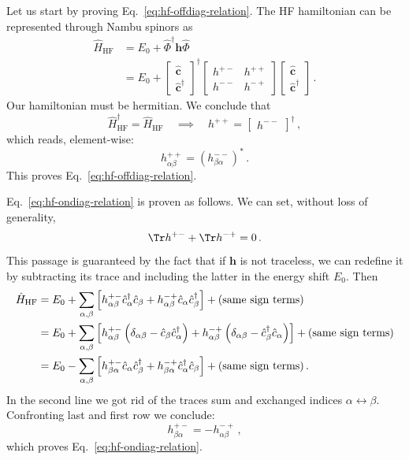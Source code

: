 \begin{tabproof}
	
	Let us start by proving Eq.~\eqref{eq:hf-offdiag-relation}. The HF hamiltonian can be represented through Nambu spinors as
	\[
	\begin{aligned}
		\hat H_\mathrm{HF} &= E_0 + \hat \Phi^\dagger \mathbf{h} \hat \Phi \\
		&= E_0 + \begin{bmatrix}
			\hat{\mathbf{c}} \\ \hat{\mathbf{c}}^\dagger
		\end{bmatrix}^\dagger \begin{bmatrix}
			h^{+-} & h^{++} \\
			h^{--} & h^{-+}
		\end{bmatrix} \begin{bmatrix}
		\hat{\mathbf{c}} \\ \hat{\mathbf{c}}^\dagger
		\end{bmatrix} \, .
	\end{aligned}
	\]
	Our hamiltonian must be hermitian. We conclude that
	\[
		\hat H_\mathrm{HF}^\dagger = \hat H_\mathrm{HF}
		\quad\implies\quad
		h^{++} = \begin{bmatrix}
			h^{--}
		\end{bmatrix}^\dagger \, ,
	\]
	which reads, element-wise:
	\[
		h_{\alpha\beta}^{++} = \left(h_{\beta\alpha}^{--}\right)^* \, .
	\]
	This proves Eq.~\eqref{eq:hf-offdiag-relation}.
	
	Eq.~\eqref{eq:hf-ondiag-relation} is proven as follows. We can set, without loss of generality,
	\[
		\Tr h^{+-} + \Tr h^{-+} = 0 \, .
	\]
	This passage is guaranteed by the fact that if $\mathbf{h}$ is not traceless, we can redefine it by subtracting its trace and including the latter in the energy shift $E_0$. Then
	\[
	\begin{aligned}
		\hat H_\mathrm{HF} &= E_0 + \sum_{\alpha,\beta} \left[
			h_{\alpha\beta}^{+-} \hat c_\alpha^\dagger \hat c_\beta + h_{\alpha\beta}^{-+} \hat c_\alpha \hat c_\beta^\dagger
		\right] + (\text{same sign terms}) \\
		&= E_0 + \sum_{\alpha,\beta} \left[
			h_{\alpha\beta}^{+-} \left(\delta_{\alpha\beta} - \hat c_\beta \hat c_\alpha^\dagger \vphantom{c_\beta^\dagger} \right) + h_{\alpha\beta}^{-+} \left(\delta_{\alpha\beta} - \hat c_\beta^\dagger \hat c_\alpha\right)
		\right] + (\text{same sign terms}) \\
		&= E_0 -\sum_{\alpha,\beta} \left[
			h_{\beta\alpha}^{+-} \hat c_\alpha \hat c_\beta^\dagger + h_{\beta\alpha}^{-+} \hat c_\alpha^\dagger \hat c_\beta
		\right] + (\text{same sign terms}) \, .
	\end{aligned}
	\]
	In the second line we got rid of the traces sum and exchanged indices $\alpha \leftrightarrow \beta$. Confronting last and first row we conclude:
	\[
		h_{\beta\alpha}^{+-} = - h_{\alpha\beta}^{-+} \, ,
	\]
	which proves Eq.~\eqref{eq:hf-ondiag-relation}.
\end{tabproof}

